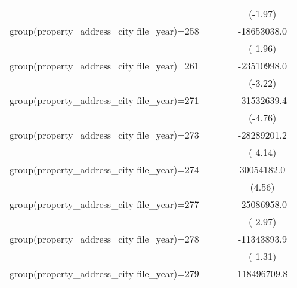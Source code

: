 {\begin{tabular}{l*{4}{c}}
                    &                     &                     &                     &     (-1.97)         \\
\addlinespace
group(property\_address\_city file\_year)=258&                     &                     &                     & -18653038.0\sym{*}  \\
                    &                     &                     &                     &     (-1.96)         \\
\addlinespace
group(property\_address\_city file\_year)=261&                     &                     &                     & -23510998.0\sym{**} \\
                    &                     &                     &                     &     (-3.22)         \\
\addlinespace
group(property\_address\_city file\_year)=271&                     &                     &                     & -31532639.4\sym{***}\\
                    &                     &                     &                     &     (-4.76)         \\
\addlinespace
group(property\_address\_city file\_year)=273&                     &                     &                     & -28289201.2\sym{***}\\
                    &                     &                     &                     &     (-4.14)         \\
\addlinespace
group(property\_address\_city file\_year)=274&                     &                     &                     &  30054182.0\sym{***}\\
                    &                     &                     &                     &      (4.56)         \\
\addlinespace
group(property\_address\_city file\_year)=277&                     &                     &                     & -25086958.0\sym{**} \\
                    &                     &                     &                     &     (-2.97)         \\
\addlinespace
group(property\_address\_city file\_year)=278&                     &                     &                     & -11343893.9         \\
                    &                     &                     &                     &     (-1.31)         \\
\addlinespace
group(property\_address\_city file\_year)=279&                     &                     &                     & 118496709.8\sym{***}\\

\end{tabular}}
